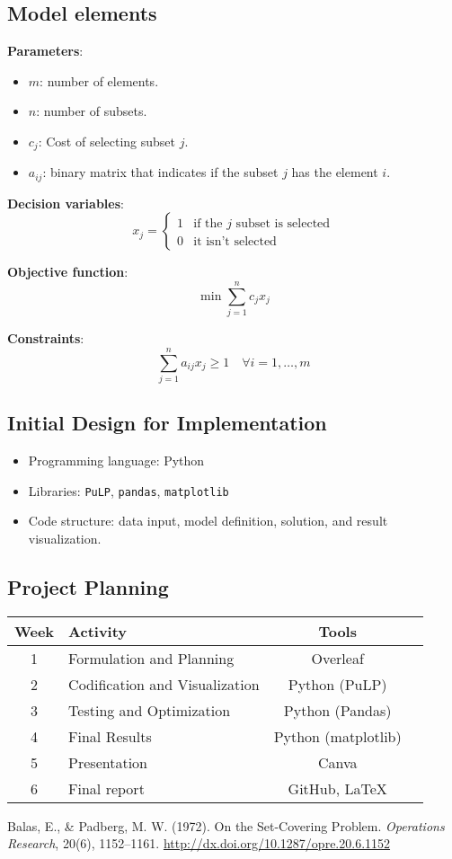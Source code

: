\documentclass[12pt]{article}
\begin{document}
\subsection{Model elements}
\textbf{Parameters}:
\begin{itemize}
    \item $m$: number of elements.
    \item $n$: number of subsets.
    \item $c_j$: Cost of selecting subset $j$.
    \item $a_{ij}$: binary matrix that indicates if the subset $j$ has the element $i$.
\end{itemize}

\textbf{Decision variables}:
\[
x_j = \begin{cases}
1 & \text{if the $j$ subset is selected} \\
0 & \text{it isn't selected}
\end{cases}
\]

\textbf{Objective function}:
\[
\min \sum_{j=1}^{n} c_j x_j
\]

\textbf{Constraints}:
\[
\sum_{j=1}^{n} a_{ij} x_j \geq 1 \quad \forall i = 1, \dots, m
\]

\subsection{Initial Design for Implementation}
\begin{itemize}
    \item Programming language: Python
    \item Libraries: \texttt{PuLP}, \texttt{pandas}, \texttt{matplotlib}
    \item Code structure: data input, model definition, solution, and result visualization.
\end{itemize}

\subsection{Project Planning}
\begin{longtable}{|c|p{8cm}|c|c|}
\hline
\textbf{Week} & \textbf{Activity} & \textbf{Tools} \\
\hline
1 & Formulation and Planning & Overleaf \\
2 & Codification and Visualization & Python (PuLP) \\
3 & Testing and Optimization & Python (Pandas) \\
4 & Final Results & Python (matplotlib) \\
5 & Presentation & Canva \\
6 & Final report & GitHub, LaTeX \\
\hline
\end{longtable}

\begin{thebibliography}{9}
Balas, E., \& Padberg, M. W. (1972). On the Set-Covering Problem. 
\textit{Operations Research}, 20(6), 1152–1161. 
\url{http://dx.doi.org/10.1287/opre.20.6.1152}
\end{thebibliography}
\end{document}
